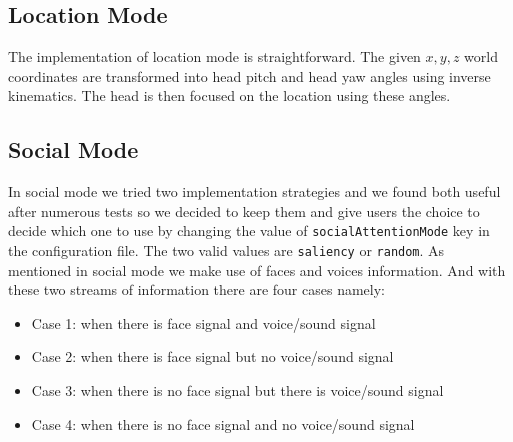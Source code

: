 \documentclass{CSSRforAfrica}
\begin{document}

\subsection{Location Mode}
The implementation of location mode is straightforward. The given $x, y, z$ world coordinates are transformed into head pitch and head yaw angles using inverse kinematics. The head is then focused on the location using these angles.

\subsection{Social Mode}
In social mode we tried two implementation strategies and we found both useful after numerous tests so we decided to keep them and give users the choice to decide which one to use by changing the value of \texttt{socialAttentionMode} key in the configuration file. The two valid values are \texttt{saliency} or \texttt{random}. As mentioned in social mode we make use of faces and voices information. And with these two streams of information there are four cases namely: 

\begin{itemize}
	\item Case 1: when there is face signal and voice/sound signal
	\item Case 2: when there is face signal but no voice/sound signal
	\item Case 3: when there is no face signal but there is voice/sound signal
	\item Case 4: when there is no face signal and no voice/sound signal
\end{itemize}
\end{document}
